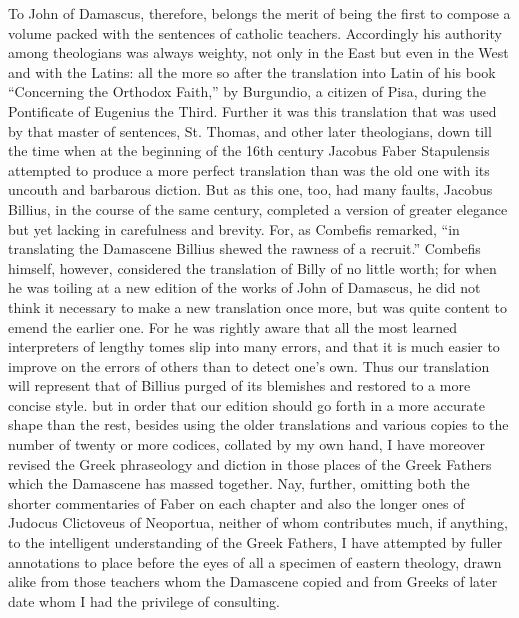 To John of Damascus, therefore, belongs the merit of being the first to compose a volume packed with the sentences of catholic teachers. Accordingly his authority among theologians was always weighty, not only in the East but even in the West and with the Latins: all the more so after the translation into Latin of his book “Concerning the Orthodox Faith,” by Burgundio, a citizen of Pisa, during the Pontificate of Eugenius the Third. Further it was this translation that was used by that master of sentences, St. Thomas, and other later theologians, down till the time when at the beginning of the 16th century Jacobus Faber Stapulensis attempted to produce a more perfect translation than was the old one with its uncouth and barbarous diction. But as this one, too, had many faults, Jacobus Billius, in the course of the same century, completed a version of greater elegance but yet lacking in carefulness and brevity. For, as Combefis remarked, “in translating the Damascene Billius shewed the rawness of a recruit.” Combefis himself, however, considered the translation of Billy of no little worth; for when he was toiling at a new edition of the works of John of Damascus, he did not think it necessary to make a new translation once more, but was quite content to emend the earlier one. For he was rightly aware that all the most learned interpreters of lengthy tomes slip into many errors, and that it is much easier to improve on the errors of others than to detect one’s own. Thus our translation will represent that of Billius purged of its blemishes and restored to a more concise style. but in order that our edition should go forth in a more accurate shape than the rest, besides using the older translations and various copies to the number of twenty or more codices, collated by my own hand, I have moreover revised the Greek phraseology and diction in those places of the Greek Fathers which the Damascene has massed together. Nay, further, omitting both the shorter commentaries of Faber on each chapter and also the longer ones of Judocus Clictoveus of Neoportua, neither of whom contributes much, if anything, to the intelligent understanding of the Greek Fathers, I have attempted by fuller annotations to place before the eyes of all a specimen of eastern theology, drawn alike from those teachers whom the Damascene copied and from Greeks of later date whom I had the privilege of consulting.

